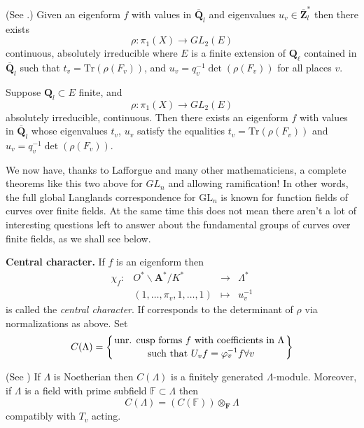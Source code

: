 \begin{theorem}
\label{theorem-drinfeld-make-rho}
(See \cite{D0}.)
Given an eigenform $f$ with values in
$\overline{\mathbf{Q}}_l$ and eigenvalues
$u_v\in \overline{\mathbf{Z}}_l^*$ then there exists
$$
\rho: \pi_1(X)\to GL_2(E)
$$
continuous, absolutely irreducible where
$E$ is a finite extension of $\mathbf{Q}_\ell$ contained in
$\overline{\mathbf{Q}}_l$ such that
$t_v = \text{Tr}(\rho(F_v))$, and
$u_v = q_v^{-1}\det\left(\rho(F_v)\right)$ for all places $v$.
\end{theorem}

\begin{theorem}
\label{theorem-drinfeld-make-f}
Suppose $\mathbf{Q}_l \subset E$ finite, and
$$
\rho: \pi_1(X)\to GL_2(E)
$$
absolutely irreducible, continuous. Then there exists an eigenform $f$ with
values in $\overline{\mathbf{Q}}_l$ whose eigenvalues $t_v$, $u_v$
satisfy the equalities
$t_v = \text{Tr}(\rho(F_v))$ and $u_v=q_v^{-1}\det(\rho(F_v))$.
\end{theorem}

\begin{remark}
\label{remark-lafforgue}
We now have, thanks to Lafforgue and many other mathematiciens,
a complete theorems like this two above for $GL_n$ and allowing ramification!
In other words, the full global Langlands correspondence for $\text{GL}_n$
is known for function fields of curves over finite fields. At the same
time this does not mean there aren't a lot of interesting questions left
to answer about the fundamental groups of curves over finite fields, as
we shall see below.
\end{remark}

\noindent
{\bf Central character.} If $f$ is an eigenform then
$$
\begin{matrix}
\chi_f : &
O^*\backslash \mathbf{A}^*/K^* &
\to &
\Lambda^* \\
&
(1, \ldots, \pi_v, 1, \ldots, 1) &
\mapsto &
u_v^{-1}
\end{matrix}
$$
is called the {\it central character}. If corresponds to the
determinant of $\rho$ via normalizations as above. Set
$$
C(\Lambda)=\left\{{\text{unr. cusp forms } f \text{ with coefficients
in }\Lambda}\atop {\text{ such that } U_v f = \varphi_v^{-1}f\forall
v}\right\}
$$

\begin{proposition}
\label{proposition-cusp-forms-finite}
(See \cite[Proposition 4.7]{dJ-conjecture})
If $\Lambda$ is Noetherian then $C(\Lambda)$ is a
finitely generated $\Lambda$-module. Moreover, if $\Lambda$ is a field with
prime subfield $\mathbb F\subset \Lambda$ then
$$
C(\Lambda)=(C(\mathbb F))\otimes_{\mathbf{F}}\Lambda
$$
compatibly with $T_v$ acting.
\end{proposition}

